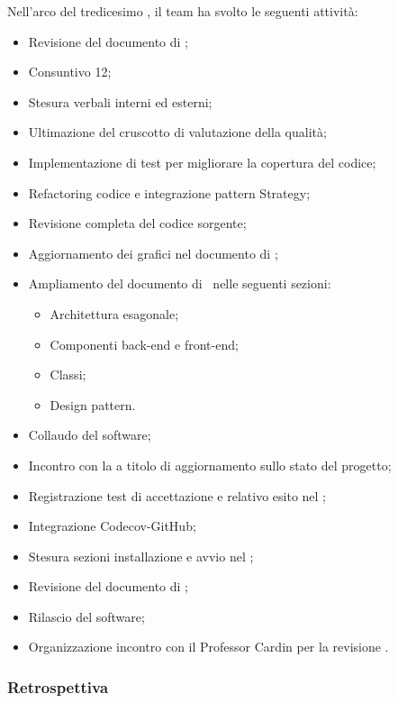 Nell'arco del tredicesimo , il team ha svolto le seguenti attività:
\begin{itemize}
  \item Revisione del documento di \AdR;
  \item Consuntivo  12;
  \item Stesura verbali interni ed esterni;
  \item Ultimazione del cruscotto di valutazione della qualità;
  \item Implementazione di test  per migliorare la copertura del codice;
  \item Refactoring codice  e integrazione pattern Strategy;
  \item Revisione completa del codice sorgente;
  \item Aggiornamento dei grafici nel documento di \ST;
  \item Ampliamento del documento di \ST\ nelle seguenti sezioni:
  \begin{itemize}
    \item Architettura esagonale;
    \item Componenti back-end e front-end;
    \item Classi;
    \item Design pattern.
  \end{itemize}
  \item Collaudo del software;
  \item Incontro con la  a titolo di aggiornamento sullo stato del progetto;
  \item Registrazione test di accettazione e relativo esito nel \PdQ;
  \item Integrazione Codecov-GitHub;
  \item Stesura sezioni installazione e avvio nel \MU;
  \item Revisione del documento di \ST;
  \item Rilascio del software;
  \item Organizzazione incontro con il Professor Cardin per la revisione .
\end{itemize}

\subsubsection{Retrospettiva}

